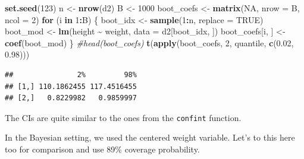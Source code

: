 \documentclass[
]{book}
\newenvironment{Shaded}{\begin{snugshade}}{\end{snugshade}}
\newcommand{\AttributeTok}[1]{\textcolor[rgb]{0.13,0.29,0.53}{#1}}
\newcommand{\CommentTok}[1]{\textcolor[rgb]{0.56,0.35,0.01}{\textit{#1}}}
\newcommand{\ConstantTok}[1]{\textcolor[rgb]{0.56,0.35,0.01}{#1}}
\newcommand{\ControlFlowTok}[1]{\textcolor[rgb]{0.13,0.29,0.53}{\textbf{#1}}}
\newcommand{\DecValTok}[1]{\textcolor[rgb]{0.00,0.00,0.81}{#1}}
\newcommand{\FloatTok}[1]{\textcolor[rgb]{0.00,0.00,0.81}{#1}}
\newcommand{\FunctionTok}[1]{\textcolor[rgb]{0.13,0.29,0.53}{\textbf{#1}}}
\newcommand{\NormalTok}[1]{#1}
\newcommand{\OtherTok}[1]{\textcolor[rgb]{0.56,0.35,0.01}{#1}}
\newcommand{\SpecialCharTok}[1]{\textcolor[rgb]{0.81,0.36,0.00}{\textbf{#1}}}
\begin{document}
\begin{Shaded}
\begin{Highlighting}[]
\FunctionTok{set.seed}\NormalTok{(}\DecValTok{123}\NormalTok{)}
\NormalTok{n }\OtherTok{\textless{}{-}} \FunctionTok{nrow}\NormalTok{(d2)}
\NormalTok{B }\OtherTok{\textless{}{-}} \DecValTok{1000}
\NormalTok{boot\_coefs }\OtherTok{\textless{}{-}} \FunctionTok{matrix}\NormalTok{(}\ConstantTok{NA}\NormalTok{, }\AttributeTok{nrow =}\NormalTok{ B, }\AttributeTok{ncol =} \DecValTok{2}\NormalTok{)}
\ControlFlowTok{for}\NormalTok{ (i }\ControlFlowTok{in} \DecValTok{1}\SpecialCharTok{:}\NormalTok{B) \{}
\NormalTok{  boot\_idx }\OtherTok{\textless{}{-}} \FunctionTok{sample}\NormalTok{(}\DecValTok{1}\SpecialCharTok{:}\NormalTok{n, }\AttributeTok{replace =} \ConstantTok{TRUE}\NormalTok{)}
\NormalTok{  boot\_mod }\OtherTok{\textless{}{-}} \FunctionTok{lm}\NormalTok{(height }\SpecialCharTok{\textasciitilde{}}\NormalTok{ weight, }\AttributeTok{data =}\NormalTok{ d2[boot\_idx, ])}
\NormalTok{  boot\_coefs[i, ] }\OtherTok{\textless{}{-}} \FunctionTok{coef}\NormalTok{(boot\_mod)}
\NormalTok{\}}
\CommentTok{\#head(boot\_coefs)}
\FunctionTok{t}\NormalTok{(}\FunctionTok{apply}\NormalTok{(boot\_coefs, }\DecValTok{2}\NormalTok{, quantile, }\FunctionTok{c}\NormalTok{(}\FloatTok{0.02}\NormalTok{, }\FloatTok{0.98}\NormalTok{)))}
\end{Highlighting}
\end{Shaded}

\begin{verbatim}
##               2%         98%
## [1,] 110.1862455 117.4516455
## [2,]   0.8229982   0.9859997
\end{verbatim}

The CIs are quite similar to the ones from the \texttt{confint} function.

In the Bayesian setting, we used the centered weight variable. Let's to this here too for
comparison and use 89\% coverage probability.

\begin{Shaded}
\end{Shaded}
\end{document}

